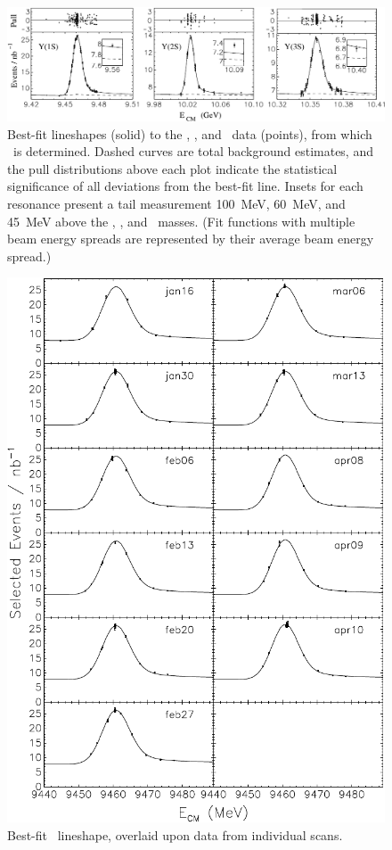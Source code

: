 \documentclass{cornell}
\begin{document}
\begin{figure}
  \begin{center}
    \includegraphics[width=\linewidth]{freefits}
  \end{center}
  \caption[Best-fit lineshapes for \us, \uss, and
  \usss]{\label{fitresults} Best-fit lineshapes (solid) to the \us,
  \uss, and \usss\ data (points), from which \geehadtot\ is
  determined.  Dashed curves are total background estimates, and the
  pull distributions above each plot indicate the statistical
  significance of all deviations from the best-fit line.  Insets for
  each resonance present a tail measurement 100~MeV, 60~MeV, and
  45~MeV above the \us, \uss, and \usss\ masses.  (Fit functions with
  multiple beam energy spreads are represented by their average beam
  energy spread.)}
\end{figure}

\begin{figure}[p]
  \begin{center}
    \includegraphics[width=0.9\linewidth]{newnewplots/allscanss}
  \end{center}
  \caption[Best-fit lineshape for each \us\ scan]{\label{allscanss} Best-fit \us\ lineshape,
  overlaid upon data from individual scans.}
\end{figure}
\end{document}
